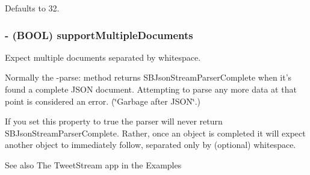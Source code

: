 \-Defaults to 32. \hypertarget{interface_s_b_json_stream_parser_afd976c605b67edbb8b7abbebcc5b4093}{
\subsubsection[{support\-Multiple\-Documents}]{\setlength{\rightskip}{0pt plus 5cm}-\/ (\-B\-O\-O\-L) support\-Multiple\-Documents}}
\label{interface_s_b_json_stream_parser_afd976c605b67edbb8b7abbebcc5b4093}


\-Expect multiple documents separated by whitespace. 

\-Normally the {\ttfamily -\/parse}\-: method returns \-S\-B\-Json\-Stream\-Parser\-Complete when it's found a complete \-J\-S\-O\-N document. \-Attempting to parse any more data at that point is considered an error. (\char`\"{}\-Garbage after J\-S\-O\-N\char`\"{}.)

\-If you set this property to true the parser will never return \-S\-B\-Json\-Stream\-Parser\-Complete. \-Rather, once an object is completed it will expect another object to immediately follow, separated only by (optional) whitespace.

\begin{DoxySeeAlso}{\-See also}
\-The \-Tweet\-Stream app in the \-Examples 
\end{DoxySeeAlso}


